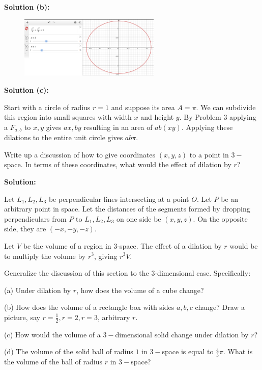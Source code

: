 \textbf{Solution (b):}

\begin{figure}[h]
    \centering
    \includegraphics[width=0.6\textwidth]{images/ellipse.png}
\end{figure}

\textbf{Solution (c):}

Start with a circle of radius $r = 1$
    and suppose its area $A = \pi$.
We can subdivide this region into small squares with width $x$ and height $y$.
By Problem $3$ applying a $F_{a, b}$ to $x, y$ gives $ax, by$
    resulting in an area of $ab(xy)$.
Applying these dilations to the entire unit circle gives $ab\pi$.

\begin{tcolorbox}[title=Problem 7, breakable]
    Write up a discussion of how to give coordinates $(x, y, z)$ to 
    a point in $3-$space. In terms of these coordinates, what would the 
    effect of dilation by $r$?
\end{tcolorbox}

\textbf{Solution:}

Let $L_1, L_2, L_3$ be perpendicular lines intersecting at a point $O$.
Let $P$ be an arbitrary point in space.
Let the distances of the segments formed by dropping perpendiculars
    from $P$ to $L_1, L_2, L_3$ on one side be $(x, y, z)$.
On the opposite side, they are $(-x, -y, -z)$.

Let $V$ be the volume of a region in $3$-space. The effect of 
a dilation by $r$ would be to multiply the volume by $r^3$, giving $r^3 V$.

\begin{tcolorbox}[title=Problem 8, breakable]
    Generalize the discussion of this section to the $3$-dimensional
    case. Specifically:

    (a) Under dilation by $r$, how does the volume of a cube change?

    (b) How does the volume of a rectangle box with sides $a, b, c$ change?
        Draw a picture, say $r = \frac{1}{2}, r = 2, r = 3$, arbitrary $r$.

    (c) How would the volume of a $3-$dimensional solid change under 
        dilation by $r$?

    (d) The volume of the solid ball of radius $1$ in $3-$space is equal 
        to $\frac{4}{3} \pi$. What is the volume of the ball of radius 
        $r$ in $3-$space?
\end{tcolorbox}

